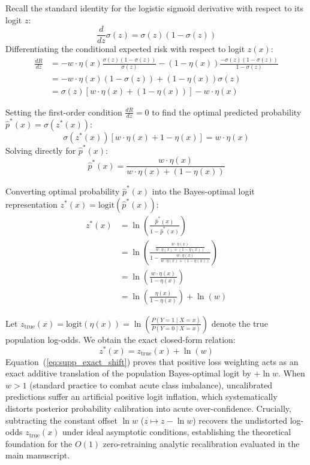 \documentclass[preprint,12pt]{elsarticle}
\begin{document}
Recall the standard identity for the logistic sigmoid derivative with respect to its logit $z$:
\begin{equation}
\frac{d}{dz} \sigma(z) = \sigma(z)(1 - \sigma(z))
\end{equation}
Differentiating the conditional expected risk with respect to logit $z(x)$:
\begin{align}
\frac{d R}{dz} &= - w \cdot \eta(x) \frac{\sigma(z)(1 - \sigma(z))}{\sigma(z)} - (1 - \eta(x)) \frac{-\sigma(z)(1 - \sigma(z))}{1 - \sigma(z)} \nonumber \\
&= - w \cdot \eta(x)(1 - \sigma(z)) + (1 - \eta(x))\sigma(z) \nonumber \\
&= \sigma(z) \left[ w \cdot \eta(x) + (1 - \eta(x)) \right] - w \cdot \eta(x)
\label{eq:supp_first_order}
\end{align}

Setting the first-order condition $\frac{d R}{dz} = 0$ to find the optimal predicted probability $\hat{p}^*(x) = \sigma(z^*(x))$:
\begin{equation}
\sigma(z^*(x)) \left[ w \cdot \eta(x) + 1 - \eta(x) \right] = w \cdot \eta(x)
\end{equation}
Solving directly for $\hat{p}^*(x)$:
\begin{equation}
\hat{p}^*(x) = \frac{w \cdot \eta(x)}{w \cdot \eta(x) + (1 - \eta(x))}
\label{eq:supp_opt_prob}
\end{equation}

Converting optimal probability $\hat{p}^*(x)$ into the Bayes-optimal logit representation $z^*(x) = \text{logit}(\hat{p}^*(x))$:
\begin{align}
z^*(x) &= \ln\left( \frac{\hat{p}^*(x)}{1 - \hat{p}^*(x)} \right) \nonumber \\
&= \ln\left( \frac{\frac{w \cdot \eta(x)}{w \cdot \eta(x) + (1 - \eta(x))}}{1 - \frac{w \cdot \eta(x)}{w \cdot \eta(x) + (1 - \eta(x))}} \right) \nonumber \\
&= \ln\left( \frac{w \cdot \eta(x)}{1 - \eta(x)} \right) \nonumber \\
&= \ln\left( \frac{\eta(x)}{1 - \eta(x)} \right) + \ln(w)
\label{eq:supp_bayes_logit_final}
\end{align}

Let $z_{\text{true}}(x) = \text{logit}(\eta(x)) = \ln\left(\frac{P(Y=1 \mid X=x)}{P(Y=0 \mid X=x)}\right)$ denote the true population log-odds. We obtain the exact closed-form relation:
\begin{equation}
z^*(x) = z_{\text{true}}(x) + \ln(w)
\label{eq:supp_exact_shift}
\end{equation}
Equation~(\ref{eq:supp_exact_shift}) proves that positive loss weighting acts as an exact additive translation of the population Bayes-optimal logit by $+\ln w$. When $w > 1$ (standard practice to combat acute class imbalance), uncalibrated predictions suffer an artificial positive logit inflation, which systematically distorts posterior probability calibration into acute over-confidence. Crucially, subtracting the constant offset $\ln w$ ($z \mapsto z - \ln w$) recovers the undistorted log-odds $z_{\text{true}}(x)$ under ideal asymptotic conditions, establishing the theoretical foundation for the $O(1)$ zero-retraining analytic recalibration evaluated in the main manuscript.
\end{document}
